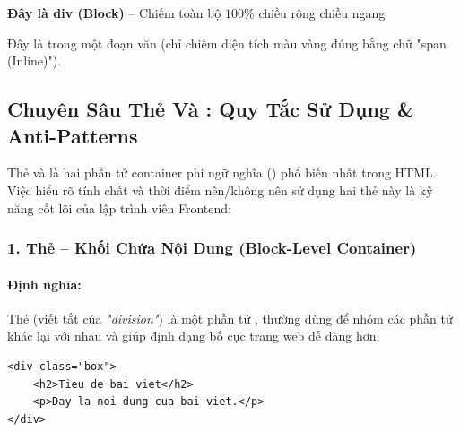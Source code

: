 \begin{browserWindow}
\begin{tcolorbox}[enhanced, colback=blue!15, colframe=blue!30, arc=4pt, boxrule=0.6pt, top=4pt, bottom=4pt, left=8pt, right=8pt, before=\par\vspace{3pt}, after=\par\vspace{3pt}]
\sffamily\small\textbf{Đây là div (Block)} -- Chiếm toàn bộ $100\%$ chiều rộng chiều ngang
\end{tcolorbox}
\par\vspace{3pt}
\sffamily\small
Đây là  trong một đoạn văn (chỉ chiếm diện tích màu vàng đúng bằng chữ "span (Inline)").
\end{browserWindow}
\clearpage
\subsection{Chuyên Sâu Thẻ  Và : Quy Tắc Sử Dụng \& Anti-Patterns}

Thẻ  và  là hai phần tử container phi ngữ nghĩa () phổ biến nhất trong HTML. Việc hiểu rõ tính chất và thời điểm nên/không nên sử dụng hai thẻ này là kỹ năng cốt lõi của lập trình viên Frontend:

\subsubsection{1. Thẻ  -- Khối Chứa Nội Dung (Block-Level Container)}

\paragraph{Định nghĩa:}
Thẻ  (viết tắt của \textit{"division"}) là một phần tử , thường dùng để nhóm các phần tử khác lại với nhau và giúp định dạng bố cục trang web dễ dàng hơn.

\begin{codeWindow}
\begin{lstlisting}[language=HTML5]
<div class="box">
    <h2>Tieu de bai viet</h2>
    <p>Day la noi dung cua bai viet.</p>
</div>
\end{lstlisting}
\end{codeWindow}

